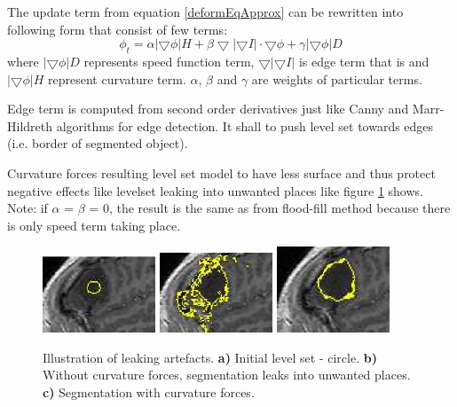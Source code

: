 The update term from equation \ref{deformEqApprox} can be rewritten into following form that consist of few terms:
\begin{equation}
\phi_t = \alpha |\bigtriangledown \phi| H + \beta
\bigtriangledown|\bigtriangledown I|\cdot \bigtriangledown \phi +
\gamma|\bigtriangledown \phi|D
\end{equation}
where $|\bigtriangledown \phi|D$ represents speed function term, $\bigtriangledown|\bigtriangledown I|$ is edge term that is and $|\bigtriangledown \phi| H$ represent curvature term. $\alpha$, $\beta$ and $\gamma$ are weights of particular terms.

Edge term is computed from second order derivatives just like Canny and Marr-Hildreth algorithms for edge detection.
It shall to push level set towards edges (i.e. border of segmented object).

Curvature forces resulting level set model to have less surface and thus protect negative effects like levelset leaking into unwanted places like figure \ref{fg:leaking} shows.
Note: if $\alpha$ = $\beta$ = 0, the result is the same as from flood-fill method because there is only speed term taking place.

\begin{figure}
    \centering
    \includegraphics[width=0.3\textwidth]{data/png/leaking1}
    \includegraphics[width=0.3\textwidth]{data/png/leaking2}
    \includegraphics[width=0.3\textwidth]{data/png/leaking3}
    \caption[Leaking]{Illustration of leaking artefacts.
    \textbf{a)} Initial level set - circle.
    \textbf{b)} Without curvature forces, segmentation leaks into unwanted places.
    \textbf{c)} Segmentation with curvature forces.
}
    \label{fg:leaking}
\end{figure}

